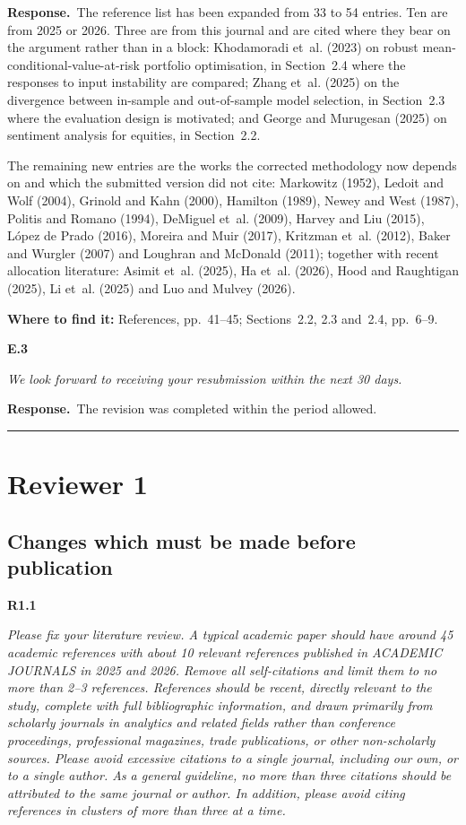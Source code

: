 \documentclass[11pt,a4paper]{article}
\newcommand{\rc}[2]{%
  \par\medskip\noindent
  \colorbox{qbg}{\parbox{\dimexpr\linewidth-2\fboxsep}{%
  \textbf{#1}\par\smallskip\itshape #2}}\par\nopagebreak}
\newcommand{\resp}{\par\medskip\noindent\textbf{Response.}\ }
\newcommand{\where}[1]{\par\smallskip\noindent\textcolor{blue!55!black}{\textbf{Where to find it:} #1}\par}
\begin{document}
\resp The reference list has been expanded from 33 to 54 entries. Ten are from 2025 or
2026. Three are from this journal and are cited where they bear on the argument rather
than in a block: Khodamoradi et~al. (2023) on robust mean-conditional-value-at-risk
portfolio optimisation, in Section~2.4 where the responses to input instability are
compared; Zhang et~al. (2025) on the divergence between in-sample and out-of-sample model
selection, in Section~2.3 where the evaluation design is motivated; and George and
Murugesan (2025) on sentiment analysis for equities, in Section~2.2.

The remaining new entries are the works the corrected methodology now depends on and which
the submitted version did not cite: Markowitz (1952), Ledoit and Wolf (2004), Grinold and
Kahn (2000), Hamilton (1989), Newey and West (1987), Politis and Romano (1994), DeMiguel
et~al. (2009), Harvey and Liu (2015), López de Prado (2016), Moreira and Muir (2017),
Kritzman et~al. (2012), Baker and Wurgler (2007) and Loughran and McDonald (2011);
together with recent allocation literature: Asimit et~al. (2025), Ha et~al. (2026), Hood
and Raughtigan (2025), Li et~al. (2025) and Luo and Mulvey (2026).
\where{References, pp.~41--45; Sections~2.2, 2.3 and~2.4, pp.~6--9.}

\rc{E.3}{We look forward to receiving your resubmission within the next 30 days.}

\resp The revision was completed within the period allowed.

\bigskip
\noindent\rule{\linewidth}{1pt}
\section*{Reviewer 1}

\subsection*{Changes which must be made before publication}

\rc{R1.1}{Please fix your literature review. A typical academic paper should have around
45 academic references with about 10 relevant references published in ACADEMIC JOURNALS in
2025 and 2026. Remove all self-citations and limit them to no more than 2--3 references.
References should be recent, directly relevant to the study, complete with full
bibliographic information, and drawn primarily from scholarly journals in analytics and
related fields rather than conference proceedings, professional magazines, trade
publications, or other non-scholarly sources. Please avoid excessive citations to a single
journal, including our own, or to a single author. As a general guideline, no more than
three citations should be attributed to the same journal or author. In addition, please
avoid citing references in clusters of more than three at a time.}
\end{document}
